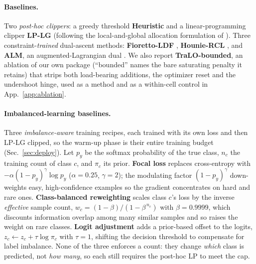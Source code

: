 \documentclass[10pt]{article}
\begin{document}
\paragraph{Baselines.}
Two \emph{post-hoc clippers}: a greedy threshold \textbf{Heuristic} and a
linear-programming clipper \textbf{LP-LG} (following the local-and-global
allocation formulation of \citealt{shifman2025classification}). %
{Three}
constraint-\emph{trained} dual-ascent
methods: \textbf{Fioretto-LDF} \citep{fioretto2020lagrangian}%
{,}
\textbf{Hounie-RCL} \citep{hounie2023resilient}{, and \textbf{ALM},
an augmented-Lagrangian dual \citep{bertsekas1982constrained}}. We also report
\textbf{TraLO-bounded}, an ablation of our own package (``bounded'' names
the bare saturating penalty it retains) that strips both load-bearing
additions, the optimizer reset and the undershoot hinge, used as a method
and as a within-cell control in App.~\ref{app:ablation}.

{\paragraph{Imbalanced-learning baselines.}
Three \emph{imbalance-aware} training recipes, each trained with its own loss and then
LP-LG clipped, so the warm-up phase is their entire training budget
(Sec.~\ref{sec:deploy}). Let $p_y$ be the softmax probability of the true class, $n_c$
the training count of class $c$, and $\pi_c$ its prior. \textbf{Focal loss}
\citep{lin2017focal} replaces cross-entropy with
$-\alpha(1-p_y)^{\gamma}\log p_y$ ($\alpha{=}0.25$, $\gamma{=}2$); the modulating factor
$(1-p_y)^{\gamma}$ down-weights easy, high-confidence examples so the gradient
concentrates on hard and rare ones. \textbf{Class-balanced reweighting}
\citep{cui2019class} scales class $c$'s loss by the inverse \emph{effective} sample
count, $w_c = (1-\beta)/(1-\beta^{\,n_c})$ with $\beta{=}0.9999$, which discounts
information overlap among many similar samples and so raises the weight on rare classes.
\textbf{Logit adjustment} \citep{menon2020long} adds a prior-based offset to the logits,
$z_c \leftarrow z_c + \tau\log\pi_c$ with $\tau{=}1$, shifting the decision threshold to
compensate for label imbalance. None of the three enforces a count: they change
\emph{which} class is predicted, not \emph{how many}, so each still requires the post-hoc
LP to meet the cap.}
\end{document}
